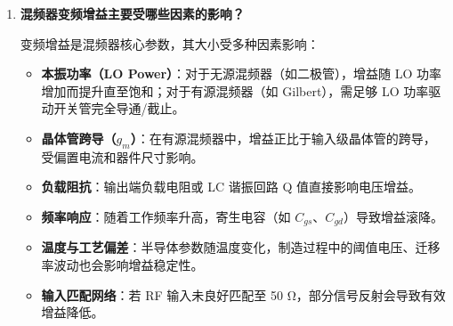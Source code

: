 \documentclass[12pt]{article}
\begin{document}
\begin{enumerate}[label=(\arabic*), leftmargin=*]
    \item \textbf{混频器变频增益主要受哪些因素的影响？}

    变频增益是混频器核心参数，其大小受多种因素影响：

    \begin{itemize}
        \item \textbf{本振功率（LO Power）}：对于无源混频器（如二极管），增益随 LO 功率增加而提升直至饱和；对于有源混频器（如 Gilbert），需足够 LO 功率驱动开关管完全导通/截止。
        \item \textbf{晶体管跨导（$g_m$）}：在有源混频器中，增益正比于输入级晶体管的跨导，受偏置电流和器件尺寸影响。
        \item \textbf{负载阻抗}：输出端负载电阻或 LC 谐振回路 Q 值直接影响电压增益。
        \item \textbf{频率响应}：随着工作频率升高，寄生电容（如 $C_{gs}$、$C_{gd}$）导致增益滚降。
        \item \textbf{温度与工艺偏差}：半导体参数随温度变化，制造过程中的阈值电压、迁移率波动也会影响增益稳定性。
        \item \textbf{输入匹配网络}：若 RF 输入未良好匹配至 50 Ω，部分信号反射会导致有效增益降低。
    \end{itemize}
\end{enumerate}
\end{document}
